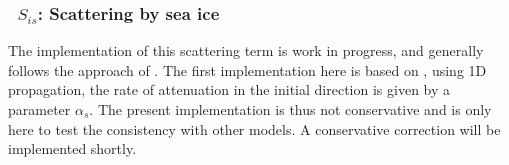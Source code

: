 \vsssub
\subsubsection{~$S_{is}$: Scattering by sea ice} \label{sec:IS2}
\vsssub


\noindent
The implementation of this scattering term is work in progress, and generally 
follows the approach of \cite{art:MM06}. The first implementation here is based on \cite{art:KM08}, 
using 1D propagation, the rate of attenuation in the initial direction is given by a 
parameter $\alpha_{s}$. The present implementation is thus not conservative and is only here 
to test the consistency with other models. A conservative correction will be implemented shortly. 


